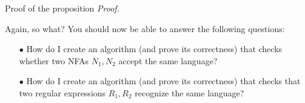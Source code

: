 \documentclass[10pt]{beamer}
\begin{document}
\begin{frame}[t]{Proof of the proposition}
    \textit{Proof.}

\end{frame}

\begin{frame}{Again, so what?}
    You should now be able to answer the following questions:
    \begin{itemize}
        \item[$\bullet$] How do I create an algorithm (and prove its correctness) that checks whether two NFAs $N_1, N_2$ accept the same language?
        \item[$\bullet$] How do I create an algorithm (and prove its correctness) that checks that two regular expressions $R_1, R_2$ recognize the same language?
    \end{itemize}
\end{frame}
\end{document}

